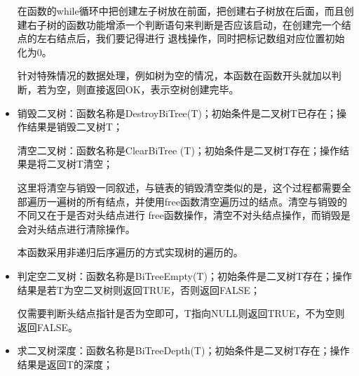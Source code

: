 \documentclass[supercite]{Experimental_Report}
\theoremstyle{definition}
\begin{document}
\begin{itemize}
	      在函数的while循环中把创建左子树放在前面，把创建右子树放在后面，而且创建右子树的函数功能增添一个判断语句来判断是否应该启动，在创建完一个结点的左右结点后，我们要记得进行
	      退栈操作，同时把标记数组对应位置初始化为0。

	      针对特殊情况的数据处理，例如树为空的情况，本函数在函数开头就加以判断，若为空，则直接返回OK，表示空树创建完毕。
	\item 销毁二叉树：函数名称是DestroyBiTree(T)；初始条件是二叉树T已存在；操作结果是销毁二叉树T；

	      清空二叉树：函数名称是ClearBiTree (T)；初始条件是二叉树T存在；操作结果是将二叉树T清空；

	      这里将清空与销毁一同叙述，与链表的销毁清空类似的是，这个过程都需要全部遍历一遍树的所有结点，并使用free函数清空遍历过的结点。清空与销毁的不同又在于是否对头结点进行
	      free函数操作，清空不对头结点操作，而销毁是会对头结点进行清除操作。

	      本函数采用非递归后序遍历的方式实现树的遍历的。
	\item 判定空二叉树：函数名称是BiTreeEmpty(T)；初始条件是二叉树T存在；操作结果是若T为空二叉树则返回TRUE，否则返回FALSE；

	      仅需要判断头结点指针是否为空即可，T指向NULL则返回TRUE，不为空则返回FALSE。
	\item 求二叉树深度：函数名称是BiTreeDepth(T)；初始条件是二叉树T存在；操作结果是返回T的深度；


\end{itemize}
\end{document}
